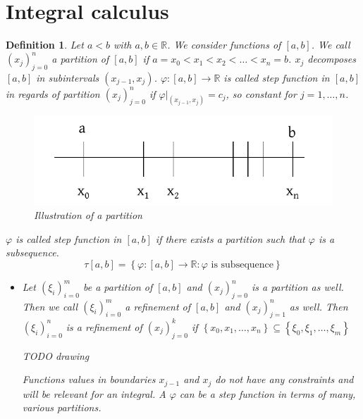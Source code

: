 \documentclass{article}
\newtheorem{definition}{Definition}  \numberwithin{definition}{section}
\newcommand{\set}[1]{\left\{#1\right\}}
\begin{document}
\section{Integral calculus}

\begin{definition}
  Let $a < b$ with $a, b \in \mathbb R$. We consider functions of $[a,b]$.
  We call $(x_j)_{j = 0}^n$ a \emph{partition of $[a,b]$} if $a = x_0 < x_1 < x_2 < \dots < x_n = b$.
  $x_j$ decomposes $[a,b]$ in subintervals $(x_{j-1}, x_j)$.
  $\varphi: [a,b] \to \mathbb R$ is called \emph{step function} in $[a,b]$ in regards of partition $(x_j)_{j=0}^n$
  if $\varphi|_{(x_{j-1}, x_j)} = c_j$, so constant for $j=1,\dots,n$.

  \begin{figure}
    \begin{center}
      \includegraphics{img/09_subintervals.pdf}
      \caption{Illustration of a partition}
      \label{img:subintervals}
    \end{center}
  \end{figure}

  $\varphi$ is called \emph{step function} in $[a,b]$ if there exists a partition such that $\varphi$ is a subsequence.
  \[ \tau[a,b] = \set{\varphi: [a,b] \to \mathbb R: \varphi \text{ is subsequence}} \]
  \begin{itemize}
    \item Let $(\xi_i)_{i=0}^m$ be a partition of $[a,b]$ and $(x_j)_{j=0}^n$ is a partition as well.
      Then we call $(\xi_i)_{i=0}^m$ a \emph{refinement} of $[a,b]$ and $(x_j)_{j=1}^n$ as well.
      Then $(\xi_i)_{i=0}^n$ is a refinement of $(x_j)_{j=0}^k$ if
      $\set{x_0, x_1, \dots, x_n} \subseteq \set{\xi_0, \xi_1, \dots, \xi_m}$

      TODO drawing %

      Functions values in boundaries $x_{j-1}$ and $x_j$ do not have any constraints and will be relevant for an integral.
      A $\varphi$ can be a step function in terms of many, various partitions.
  \end{itemize}
\end{definition}
\end{document}
